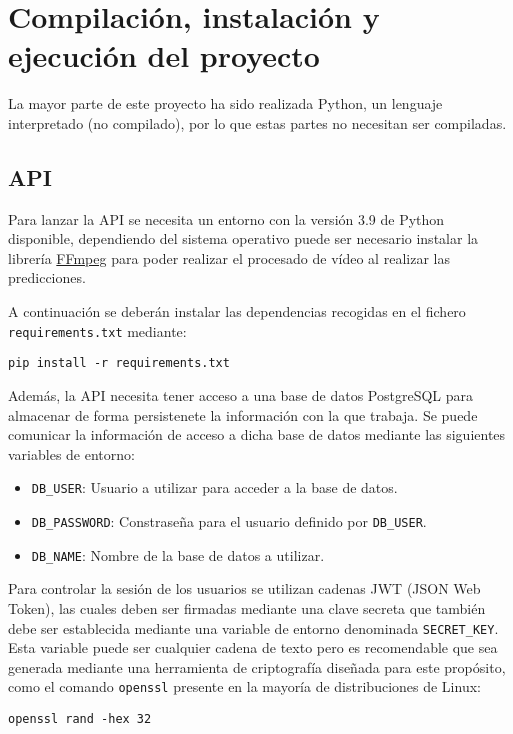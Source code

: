 \section{Compilación, instalación y ejecución del proyecto}

La mayor parte de este proyecto ha sido realizada Python, un lenguaje
interpretado (no compilado), por lo que estas partes no necesitan ser
compiladas.

\subsection{API}

Para lanzar la API se necesita un entorno con la versión 3.9 de Python
disponible, dependiendo del sistema operativo puede ser necesario instalar la
librería \href{https://ffmpeg.org}{FFmpeg} para poder realizar el procesado de
vídeo al realizar las predicciones.

A continuación se deberán instalar las dependencias recogidas en el fichero
\texttt{requirements.txt} mediante:

\texttt{pip install -r requirements.txt}

Además, la API necesita tener acceso a una base de datos PostgreSQL para
almacenar de forma persistenete la información con la que trabaja. Se puede
comunicar la información de acceso a dicha base de datos mediante las siguientes
variables de entorno:

\begin{itemize}
    \item \texttt{DB\_USER}: Usuario a utilizar para acceder a la base de datos.
    \item \texttt{DB\_PASSWORD}: Constraseña para el usuario definido por
    \texttt{DB\_USER}.
    \item \texttt{DB\_NAME}: Nombre de la base de datos a utilizar.
\end{itemize}

Para controlar la sesión de los usuarios se utilizan cadenas JWT (JSON Web
Token), las cuales deben ser firmadas mediante una clave secreta que también
debe ser establecida mediante una variable de entorno denominada
\texttt{SECRET\_KEY}. Esta variable puede ser cualquier cadena de texto pero es
recomendable que sea generada mediante una herramienta de criptografía diseñada
para este propósito, como el comando \texttt{openssl} presente en la mayoría de
distribuciones de Linux:

\texttt{openssl rand -hex 32}

